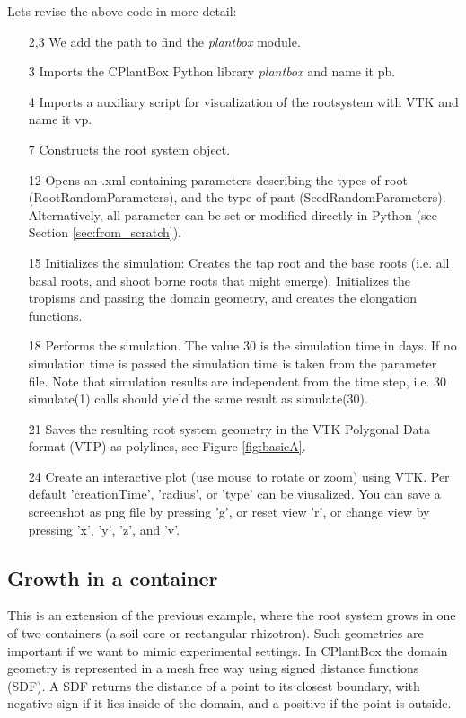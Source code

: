 \noindent 
Lets revise the above code in more detail: 
\begin{itemize}
 \item[2,3] We add the path to find the \emph{plantbox} module.
 \item[3] Imports the CPlantBox Python library \emph{plantbox} and name it pb.
 \item[4] Imports a auxiliary script for visualization of the rootsystem with VTK and name it vp.
 \item[7] Constructs the root system object.
 \item[12] Opens an .xml containing parameters describing the types of root (RootRandomParameters), 
 and the type of pant (SeedRandomParameters). Alternatively, all parameter can be set or modified directly in Python 
 (see Section \ref{sec:from_scratch}).
 \item[15] Initializes the simulation: Creates the tap root and the base roots
 (i.e. all basal roots, and shoot borne roots that might emerge). Initializes the tropisms and passing the domain geometry, 
 and creates the elongation functions. 
 \item[18] Performs the simulation. The value 30 is the simulation time in days. 
 If no simulation time is passed the simulation time is taken from the parameter file. 
 Note that simulation results are independent from the time step, i.e. 30 simulate(1) calls should yield the same result 
 as simulate(30). 
 \item[21] Saves the resulting root system geometry in the VTK Polygonal Data format (VTP) as polylines, 
 see Figure \ref{fig:basicA}. 
 \item[24] Create an interactive plot (use mouse to rotate or zoom) using VTK. 
 Per default 'creationTime', 'radius', or 'type' can be viusalized.
 You can save a screenshot as png file by pressing 'g', or reset view 'r', or change view by pressing 'x', 'y', 'z', and 'v'.
 \end{itemize}
  
\subsection{Growth in a container}

This is an extension of the previous example, where the root system grows in one of two containers 
(a soil core or rectangular rhizotron). Such geometries are important if we want to mimic experimental settings. 
In CPlantBox the domain geometry is represented in a mesh free way using signed distance functions (SDF). 
A SDF returns the distance of a point to its closest boundary, with negative sign if it lies inside of the domain, 
and a positive if the point is outside.

